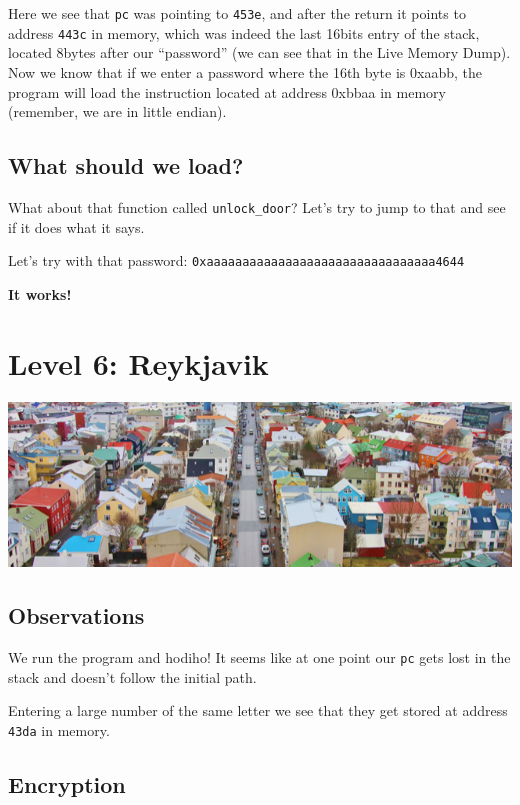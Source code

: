 \documentclass[a4paper,11pt]{article}
\begin{document}
Here we see that \texttt{pc} was pointing to \texttt{453e}, and after
the return it points to address \texttt{443c} in memory, which was
indeed the last 16bits entry of the stack, located 8bytes after our
``password'' (we can see that in the Live Memory Dump). Now we know that
if we enter a password where the 16th byte is 0xaabb, the program will
load the instruction located at address 0xbbaa in memory (remember, we
are in little endian).

\subsection{What should we load?}\label{what-should-we-load}

What about that function called \texttt{unlock\_door}? Let's try to jump
to that and see if it does what it says.

Let's try with that password:
\texttt{0xaaaaaaaaaaaaaaaaaaaaaaaaaaaaaaaa4644}

\textbf{It works!}

\section{Level 6: Reykjavik}\label{level-6-reykjavik}

\includegraphics{img/6_1.PNG}

\subsection{Observations}\label{observations-2}

We run the program and hodiho! It seems like at one point our
\texttt{pc} gets lost in the stack and doesn't follow the initial path.

Entering a large number of the same letter we see that they get stored
at address \texttt{43da} in memory.

\subsection{Encryption}\label{encryption}
\end{document}
